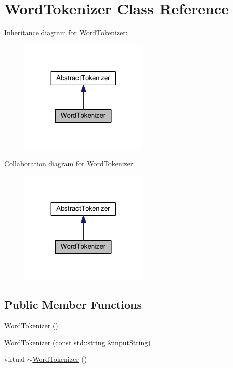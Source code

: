 \hypertarget{classWordTokenizer}{}\section{Word\+Tokenizer Class Reference}
\label{classWordTokenizer}


Inheritance diagram for Word\+Tokenizer\+:\nopagebreak
\begin{figure}[H]
\begin{center}
\leavevmode
\includegraphics[width=176pt]{classWordTokenizer__inherit__graph}
\end{center}
\end{figure}


Collaboration diagram for Word\+Tokenizer\+:\nopagebreak
\begin{figure}[H]
\begin{center}
\leavevmode
\includegraphics[width=176pt]{classWordTokenizer__coll__graph}
\end{center}
\end{figure}
\subsection*{Public Member Functions}
\begin{DoxyCompactItemize}
\item 
\hyperlink{classWordTokenizer_a78cfc8455e2b0d99ae070a9d9ef647c8}{Word\+Tokenizer} ()
\item 
\hyperlink{classWordTokenizer_ab360e49e4fc162e48060c0811d4d19f8}{Word\+Tokenizer} (const std\+::string \&input\+String)
\item 
virtual \hyperlink{classWordTokenizer_a04c986b8527bd4f556443161804b1208}{$\sim$\+Word\+Tokenizer} ()
\end{DoxyCompactItemize}
